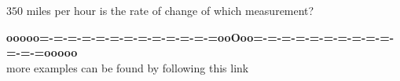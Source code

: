 \documentclass{ximera}
\begin{document}
\begin{question} 


$350$ miles per hour is the rate of change of which measurement?

\begin{multipleChoice}
\end{multipleChoice}

\end{question}















\begin{center}
\textbf{\textcolor{green!50!black}{ooooo=-=-=-=-=-=-=-=-=-=-=-=-=ooOoo=-=-=-=-=-=-=-=-=-=-=-=-=ooooo}} \\

more examples can be found by following this link\\ 

\end{center}
\end{document}
